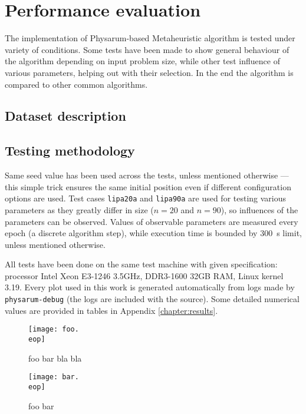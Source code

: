\section{Performance evaluation}
\label{section:project_evaluation}

The implementation of Physarum-based Metaheuristic algorithm is tested under variety of conditions. Some tests have been made to show general behaviour of the algorithm depending on input problem size, while other test influence of various parameters, helping out with their selection. In the end the algorithm is compared to other common algorithms.


\subsection{Dataset description}



\subsection{Testing methodology}

Same seed value has been used across the tests, unless mentioned otherwise --- this simple trick ensures the same initial position even if different configuration options are used. Test cases \texttt{lipa20a} and \texttt{lipa90a} are used for testing various parameters as they greatly differ in size ($n=20$ and $n=90$), so influences of the parameters can be observed. Values of observable parameters are measured every epoch (a discrete algorithm step), while execution time is bounded by 300~s limit, unless mentioned otherwise.

All tests have been done on the same test machine with given specification: processor Intel Xeon E3-1246 3.5GHz, DDR3-1600 32GB RAM, Linux kernel 3.19. Every plot used in this work is generated automatically from logs made by \texttt{physarum-debug} (the logs are included with the source). Some detailed numerical values are provided in tables in Appendix \ref{chapter:results}.


\begin{figure}
  \centering

  \texttt{[image: foo.\\eop]}

  \caption{foo bar bla bla}

\end{figure}

\begin{figure}
  \centering

  \texttt{[image: bar.\\eop]}

  \caption{foo bar}

\end{figure}




